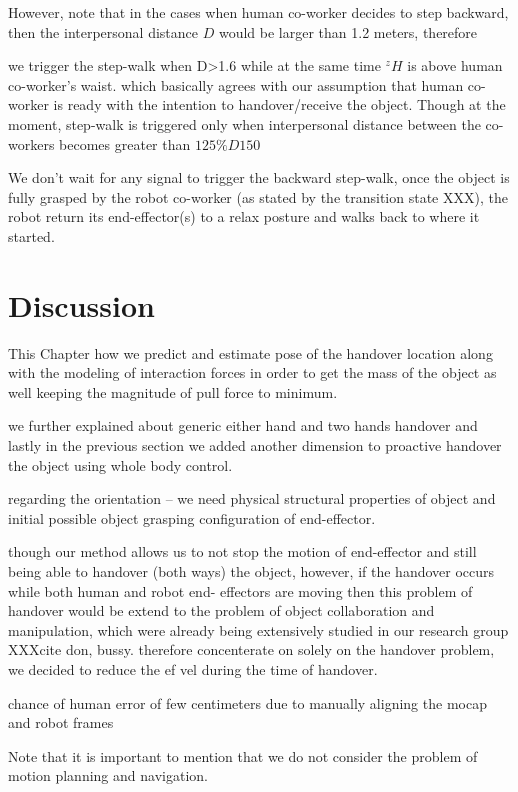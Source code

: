 However, note that in the cases when human co-worker decides to step backward, then the interpersonal distance $ D $ would be larger than 1.2 meters, therefore

we trigger the step-walk when D>1.6 while at the same time $ {}^{z}H $ is above human co-worker's waist. which basically agrees with our assumption that human co-worker is ready with the intention to handover/receive the object. Though at the moment, step-walk is triggered only when interpersonal distance between the co-workers becomes greater than $ 125\% D 150 $

We don't wait for any signal to trigger the backward step-walk, once the object is fully grasped by the robot co-worker (as stated by the transition state XXX), the robot return its end-effector(s) to a relax posture and walks back to where it started.



\clearpage

\section{Discussion}


This Chapter how we predict and estimate pose of the handover location along with the modeling of interaction forces in order to get the mass of the object as well keeping the magnitude of pull force to minimum.

we further explained about generic either hand and two hands handover and lastly in the previous section we added another dimension to proactive handover the object using whole body control.


regarding the orientation -- we need physical structural properties of object and initial possible object grasping configuration of end-effector.


though our method allows us to not stop the motion of end-effector and still being able to handover (both ways) the object, however, if the handover occurs while both human and robot end- effectors are moving then this problem of handover would be extend to the problem of object collaboration and manipulation, which were already being extensively studied in our research group XXXcite don, bussy.
therefore concenterate on solely on the handover problem, we decided to reduce the ef vel during the time of handover. 

chance of human error of few centimeters due to manually aligning the mocap and robot frames

Note that it is important to mention that we do not consider the problem of motion planning and navigation.


